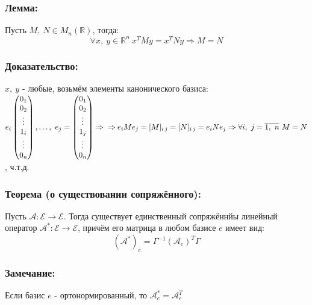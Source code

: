 \documentclass[12pt, letterpaper, twoside]{article}
\newcommand{\mb}[1]{\mathbb{#1}}
\begin{document}
    \subsubsection*{Лемма:}
    Пусть $M,\ N \in M_n(\mb{R})$, тогда:
    \[\forall x,\ y\in \mb{R}^n\ x^T My = x^T N y\Rightarrow M = N\]
    \subsubsection*{Доказательство:}
    $x,\ y$ - любые, возьмём элементы канонического базиса: $e_i \begin{pmatrix}
        {0}_1\\ {0}_2\\ \vdots\\ {1}_i\\ \vdots\\ {0}_n
    \end{pmatrix},\dots,\ e_j =\begin{pmatrix}
        {0}_1\\ {0}_2\\ \vdots\\ {1}_j\\ \vdots\\ {0}_n
    \end{pmatrix}\Rightarrow\\
    \Rightarrow e_i M e_j = [M]_{i\, j} = [N]_{i\, j} = e_i N e_j\Rightarrow \forall i,\ j = \overline{1,\ n}\ M = N$, ч.т.д.
    \subsubsection*{Теорема (о существовании сопряжённого):}
    Пусть $\mathcal{A}: \mathcal{E} \longrightarrow \mathcal{E}$. Тогда существует единственный сопряжённйы линейный оператор $\mathcal{A}^*: \mathcal{E} \longrightarrow \mathcal{E}$, причём его матрица в любом базисе $e$ имеет вид:
    \[(\mathcal{A}^*)_e = \Gamma^{-1} (\mathcal{A}_e)^T \Gamma\]
    \subsubsection*{Замечание:}
    Если базис $e$ - ортонормированный, то $\mathcal{A}_e^* = \mathcal{A}_e^T$
\end{document}
